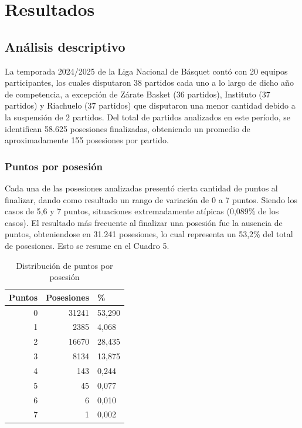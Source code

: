 \documentclass[
  12pt,
]{article}
\begin{document}
\newpage

\section{Resultados}\label{cap:resultados}

\subsection{Análisis descriptivo}\label{anuxe1lisis-descriptivo}

La temporada 2024/2025 de la Liga Nacional de Básquet contó con 20
equipos participantes, los cuales disputaron 38 partidos cada uno a lo
largo de dicho año de competencia, a excepción de Zárate Basket (36
partidos), Instituto (37 partidos) y Riachuelo (37 partidos) que
disputaron una menor cantidad debido a la suspensión de 2 partidos. Del
total de partidos analizados en este período, se identifican 58.625
posesiones finalizadas, obteniendo un promedio de aproximadamente 155
posesiones por partido.

\subsubsection{Puntos por posesión}\label{puntos-por-posesiuxf3n}

Cada una de las posesiones analizadas presentó cierta cantidad de puntos
al finalizar, dando como resultado un rango de variación de 0 a 7
puntos. Siendo los casos de 5,6 y 7 puntos, situaciones extremadamente
atípicas (0,089\% de los casos). El resultado más frecuente al finalizar
una posesión fue la ausencia de puntos, obteniendose en 31.241
posesiones, lo cual representa un 53,2\% del total de posesiones. Esto
se resume en el Cuadro 5.

\begin{table}[H]
\centering
\caption{\label{tab:unnamed-chunk-16}Distribución de puntos por posesión}
\centering
\fontsize{11}{13}\selectfont
\begin{tabular}[t]{rrl}
\toprule
Puntos & Posesiones & \%\\
\midrule
0 & 31241 & 53,290\\
1 & 2385 & 4,068\\
2 & 16670 & 28,435\\
3 & 8134 & 13,875\\
4 & 143 & 0,244\\
5 & 45 & 0,077\\
6 & 6 & 0,010\\
7 & 1 & 0,002\\
\bottomrule
\end{tabular}
\end{table}
\end{document}
